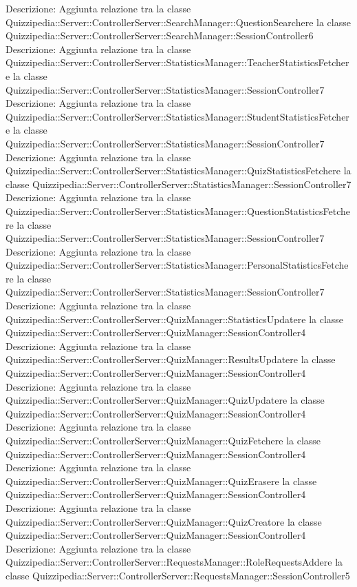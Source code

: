 Descrizione: Aggiunta relazione tra la classe Quizzipedia::Server::ControllerServer::SearchManager::QuestionSearchere la classe Quizzipedia::Server::ControllerServer::SearchManager::SessionController6 
Descrizione: Aggiunta relazione tra la classe Quizzipedia::Server::ControllerServer::StatisticsManager::TeacherStatisticsFetchere la classe Quizzipedia::Server::ControllerServer::StatisticsManager::SessionController7 
Descrizione: Aggiunta relazione tra la classe Quizzipedia::Server::ControllerServer::StatisticsManager::StudentStatisticsFetchere la classe Quizzipedia::Server::ControllerServer::StatisticsManager::SessionController7 
Descrizione: Aggiunta relazione tra la classe Quizzipedia::Server::ControllerServer::StatisticsManager::QuizStatisticsFetchere la classe Quizzipedia::Server::ControllerServer::StatisticsManager::SessionController7 
Descrizione: Aggiunta relazione tra la classe Quizzipedia::Server::ControllerServer::StatisticsManager::QuestionStatisticsFetchere la classe Quizzipedia::Server::ControllerServer::StatisticsManager::SessionController7 
Descrizione: Aggiunta relazione tra la classe Quizzipedia::Server::ControllerServer::StatisticsManager::PersonalStatisticsFetchere la classe Quizzipedia::Server::ControllerServer::StatisticsManager::SessionController7 
Descrizione: Aggiunta relazione tra la classe Quizzipedia::Server::ControllerServer::QuizManager::StatisticsUpdatere la classe Quizzipedia::Server::ControllerServer::QuizManager::SessionController4 
Descrizione: Aggiunta relazione tra la classe Quizzipedia::Server::ControllerServer::QuizManager::ResultsUpdatere la classe Quizzipedia::Server::ControllerServer::QuizManager::SessionController4 
Descrizione: Aggiunta relazione tra la classe Quizzipedia::Server::ControllerServer::QuizManager::QuizUpdatere la classe Quizzipedia::Server::ControllerServer::QuizManager::SessionController4 
Descrizione: Aggiunta relazione tra la classe Quizzipedia::Server::ControllerServer::QuizManager::QuizFetchere la classe Quizzipedia::Server::ControllerServer::QuizManager::SessionController4 
Descrizione: Aggiunta relazione tra la classe Quizzipedia::Server::ControllerServer::QuizManager::QuizErasere la classe Quizzipedia::Server::ControllerServer::QuizManager::SessionController4 
Descrizione: Aggiunta relazione tra la classe Quizzipedia::Server::ControllerServer::QuizManager::QuizCreatore la classe Quizzipedia::Server::ControllerServer::QuizManager::SessionController4 
Descrizione: Aggiunta relazione tra la classe Quizzipedia::Server::ControllerServer::RequestsManager::RoleRequestsAddere la classe Quizzipedia::Server::ControllerServer::RequestsManager::SessionController5 
